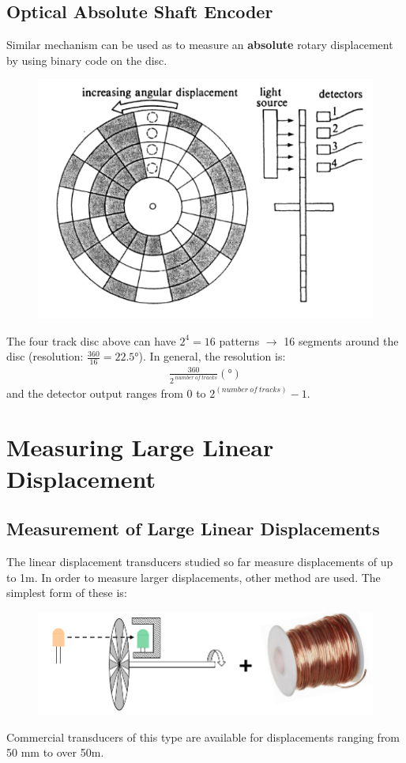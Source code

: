 \documentclass[class=report, crop=false, 12pt,a4paper]{standalone}
\begin{document}
\subsection{Optical Absolute Shaft Encoder}
Similar mechanism can be used as to measure an \textbf{absolute} rotary displacement by using binary code on the disc.
\begin{figure}[H]
  \centering
  \includegraphics[width = 0.55 \textwidth]{../img/Mdiagram17.PNG}
\end{figure}
The four track disc above can have $2^4 = 16$ patterns $\longrightarrow$ 16 segments around the disc (resolution: $\frac{360}{16} = 22.5$\si{\degree}). In general, the resolution is:
\begin{gather}
  \frac{360}{2^{\ number \ of \ tracks}}(\si{\degree})
\end{gather}
and the detector output ranges from 0 to $2^{(number \ of \ tracks)}-1$.
\section{Measuring Large Linear Displacement}
\subsection{Measurement of Large Linear Displacements}
The linear displacement transducers studied so far measure displacements of up to 1m. In order to measure larger displacements, other method are used. The simplest form of these is:
\begin{figure}[H]
  \centering
  \includegraphics[width = 0.85 \textwidth]{../img/Mdiagram18.PNG}
\end{figure}
Commercial transducers of this type are available for displacements ranging from 50 mm to over 50m.
\end{document}

